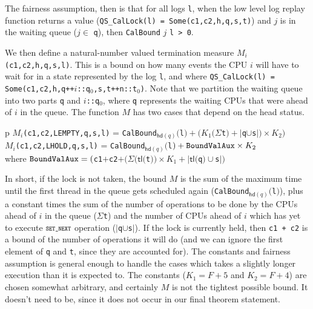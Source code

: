 The fairness assumption, then is that for all logs \lstinline$l$, 
when the low level log replay function returns a 
value (\lstinline$QS_CalLock(l) = Some(c1,c2,h,q,s,t)$) and $j$ is 
in the waiting queue ($j \in$ \lstinline$q$), then \lstinline$CalBound$ $j$ \lstinline$l > 0$. 

We then define a natural-number valued termination measure $M_i$\lstinline$(c1,c2,h,q,s,l)$. 
This is a bound on how many events the CPU $i$ will
have to wait for in a state represented by the log \lstinline$l$, and where
\lstinline$QS_CalLock(l) = Some(c1,c2,h,q++$$i$\lstinline$::q$$_0$\lstinline$,s,t++n::t$$_0$\lstinline$)$. 
Note that
we partition the waiting queue into two parts \lstinline$q$ 
and $i$\lstinline$::q$$_0$, where \lstinline$q$
represents the waiting CPUs that were ahead of $i$ in the queue.
The function $M$ has two cases that depend on the head status.
\begin{center}
\begin{tabular}{p\textwidth}
$M_i$\lstinline$(c1,c2,LEMPTY,q,s,l)$ = \lstinline$CalBound$$_{\mathsf{hd}(q)}($\lstinline$l$$) + (K_1(\Sigma $\lstinline$t$$) + |$\lstinline$q$$\cup $\lstinline$s$$|)\times K_2)$\\
$M_i$\lstinline$(c1,c2,LHOLD,q,s,l)$ = \lstinline$CalBound$$_{\mathsf{hd}(q)}($\lstinline$l$$) + {\texttt{BoundValAux}}\times K_2$ \\
\hfill	 where ${\texttt{BoundValAux}} = ($\lstinline$c1$$+$\lstinline$c2$$ + (\Sigma (\mathsf{tl}($\lstinline$t$$)) \times K_1 + |\mathsf{tl}($\lstinline$q$$)\cup $\lstinline$s$$|)$\\
\end{tabular}
\end{center}

In short, if the lock is not taken, the bound $M$ is the sum of the
maximum time until the first thread in the queue gets scheduled again
(\lstinline$CalBound$$_{\mathsf{hd}(q)}($\lstinline$l$$)$), plus a constant times
the sum of the number of operations to be done
by the CPUs ahead of $i$ in the queue ($\Sigma $\lstinline$t$) 
and the number of CPUs ahead of $i$ which has
yet to execute $\SETNEXT$ operation 
($|$\lstinline$q$$ \cup $\lstinline$s$$|$). If the lock is currently
held, then \lstinline$c1 + c2$ is a bound of the number of operations it will
do
(and we can ignore the first element of \lstinline$q$ and \lstinline$t$, since they are
accounted for).
The constants and fairness assumption is general enough to handle the cases which takes a slightly longer execution than it is expected to.
The constants ($K_1 = F+5$ and $K_2 = F+4$) are chosen somewhat
arbitrary, and certainly $M$ is not the tightest possible bound. It
doesn't need to be, since it does not occur in our final theorem
statement.

